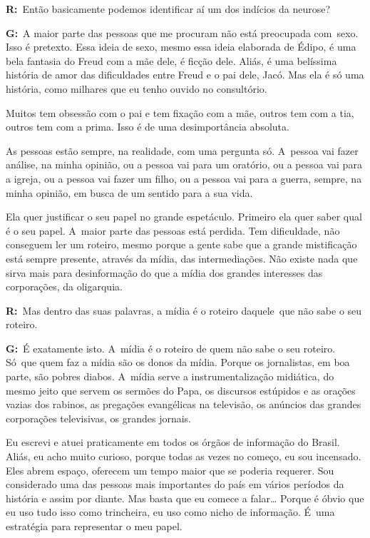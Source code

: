  

\textbf{R:}~Então basicamente podemos identificar aí um dos indícios da
neurose?

 

\textbf{G:}~A maior parte das pessoas que me procuram não está
preocupada com\textbf{}~sexo. Isso é pretexto. Essa ideia de sexo, mesmo
essa ideia elaborada de Édipo, é uma bela fantasia do Freud com a mãe
dele, é ficção dele. Aliás, é uma belíssima história de amor das
dificuldades entre Freud e o pai dele, Jacó. Mas ela é só uma história,
como milhares que eu tenho ouvido no consultório.

 

Muitos tem obsessão com o pai e tem fixação com a mãe, outros tem com a
tia, outros tem com a prima. Isso é de uma desimportância absoluta.

 

As pessoas estão sempre, na realidade, com uma pergunta só. A~pessoa vai
fazer análise, na minha opinião, ou a pessoa vai para um oratório, ou a
pessoa vai para a igreja, ou a pessoa vai fazer um filho, ou a pessoa
vai para a guerra, sempre, na minha opinião, em busca de um sentido para
a sua vida.

 

Ela quer justificar o seu papel no grande espetáculo. Primeiro ela quer
saber qual é o seu papel. A~maior parte das pessoas está perdida. Tem
dificuldade, não conseguem ler um roteiro, mesmo porque a gente sabe que
a grande mistificação está sempre presente, através da mídia, das
intermediações. Não existe nada que sirva mais para desinformação do que
a mídia dos grandes interesses das corporações, da oligarquia.

 

\textbf{R:}~Mas dentro das suas palavras, a mídia é o roteiro
daquele\textbf{}~que não sabe o seu roteiro.

 

\textbf{G:}~É exatamente isto. A~mídia é o roteiro de quem não sabe o
seu roteiro. Só\textbf{}~que quem faz a mídia são os donos da mídia.
Porque os jornalistas, em boa parte, são pobres diabos. A~mídia serve a
instrumentalização midiática, do mesmo jeito que servem os sermões do
Papa, os discursos estúpidos e as orações vazias dos rabinos, as
pregações evangélicas na televisão, os anúncios das grandes corporações
televisivas, os grandes jornais.

 

Eu escrevi e atuei praticamente em todos os órgãos de informação do
Brasil. Aliás, eu acho muito curioso, porque todas as vezes no começo,
eu sou incensado. Eles abrem espaço, oferecem um tempo maior que se
poderia requerer. Sou considerado uma das pessoas mais importantes do
país em vários períodos da história e assim por diante. Mas basta que eu
comece a falar… Porque é óbvio que eu uso tudo isso como
trincheira, eu uso como nicho de informação. É~uma estratégia para
representar o meu papel.

